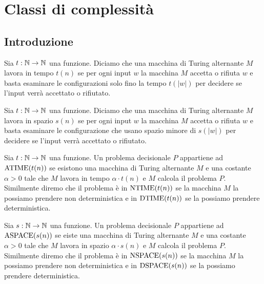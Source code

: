 \chapter{Classi di complessità}

\section{Introduzione}

\begin{definizione}
 Sia $t:\mathbb{N}\to\mathbb{N}$ una funzione. Diciamo che una macchina di Turing alternante
 $M$ lavora in tempo $t(n)$ se per ogni input $w$ la macchina $M$ accetta o
 rifiuta $w$ e basta esaminare le configurazioni solo fino la tempo $t(|w|)$
 per decidere se l'input verrà accettato o rifiutato.
\end{definizione}

\begin{definizione}
 Sia $t:\mathbb{N}\to\mathbb{N}$ una funzione. Diciamo che una macchina di Turing alternante
 $M$ lavora in spazio $s(n)$ se per ogni input $w$
 la macchina $M$ accetta o
 rifiuta $w$ e basta esaminare le configurazione
 che usano spazio minore di $s(|w|)$
 per decidere se l'input verrà accettato o rifiutato.
\end{definizione}

\begin{definizione}
 Sia $t:\mathbb{N}\to\mathbb{N}$ una funzione.
 Un problema decisionale $P$ appartiene ad $\operatorname{ATIME}(t(n))$ se esistono una macchina
 di Turing alternante $M$ e una costante $\alpha>0$ tale che $M$ lavora in tempo
 $\alpha \cdot t(n)$ e $M$ calcola il problema $P$. Similmente diremo che
 il problema è in $\operatorname{NTIME}(t(n))$ se la macchina $M$ la possiamo prendere non
 deterministica e in $\operatorname{DTIME}(t(n))$ se la possiamo prendere deterministica.
\end{definizione}

\begin{definizione}
 Sia $s:\mathbb{N}\to\mathbb{N}$ una funzione.
 Un problema decisionale $P$ appartiene ad $\operatorname{ASPACE}(s(n))$ se eiste una macchina
 di Turing alternante $M$ e una costante $\alpha>0$ tale che $M$ lavora in spazio
 $\alpha \cdot s(n)$ e $M$ calcola il problema $P$. Similmente diremo che
 il problema è in $\operatorname{NSPACE}(s(n))$ se la macchina $M$ la possiamo prendere non
 deterministica e in $\operatorname{DSPACE}(s(n))$ se la possiamo prendere deterministica.
\end{definizione}

